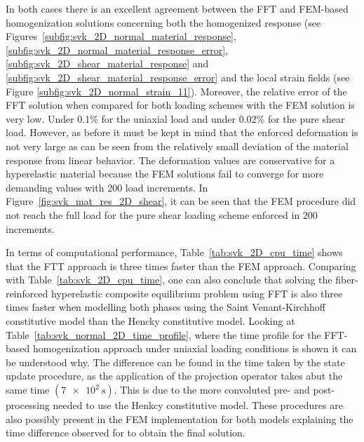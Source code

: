 In both cases there is an excellent agreement between the FFT and FEM-based homogenization solutions concerning both the homogenized response (see Figures~\ref{subfig:svk_2D_normal_material_response}, \ref{subfig:svk_2D_normal_material_response_error}, \ref{subfig:svk_2D_shear_material_response} and \ref{subfig:svk_2D_shear_material_response_error} and the local strain fields (see Figure \ref{subfig:svk_2D_normal_strain_11}).
Moreover, the relative error of the FFT solution when compared for both loading schemes with the FEM solution is very low.
Under 0.1\% for the uniaxial load and under 0.02\% for the pure shear load.
However, as before it must be kept in mind that the enforced deformation is not very large as can be seen from the relatively small deviation of the material response from linear behavior.
The deformation values are conservative for a hyperelastic material because the FEM solutions fail to converge for more demanding values with 200 load increments.
In Figure~\ref{fig:svk_mat_res_2D_shear}, it can be seen that the FEM procedure did not reach the full load for the pure shear loading scheme enforced in 200 increments.

In terms of computational performance, Table~\ref{tab:svk_2D_cpu_time} shows that the FTT approach is three times faster than the FEM approach.
Comparing with Table~\ref{tab:svk_2D_cpu_time}, one can also conclude that solving the fiber-reinforced hyperelastic composite equilibrium problem using FFT is also three times faster when modelling both phases using the Saint Venant-Kirchhoff constitutive model than the Hencky constitutive model.
Looking at Table~\ref{tab:svk_normal_2D_time_profile}, where the time profile for the FFT-based homogenization approach under uniaxial loading conditions is shown it can be understood why.
The difference can be found in the time taken by the state update procedure, as the application of the projection operator takes abut the same time \((\SI{7e2}{\second})\).
This is due to the more convoluted pre- and post-processing needed to use the Henkcy constitutive model.
These procedures are also possibly present in the FEM implementation for both models explaining the time difference observed for to obtain the final solution.


